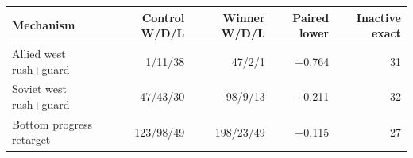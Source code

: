 \begin{tabular}{@{}lrrrr@{}}
\toprule
Mechanism & Control W/D/L & Winner W/D/L & Paired lower & Inactive exact \\
\midrule
Allied west rush+guard & 1/11/38 & 47/2/1 & +0.764 & 31 \\
Soviet west rush+guard & 47/43/30 & 98/9/13 & +0.211 & 32 \\
Bottom progress retarget & 123/98/49 & 198/23/49 & +0.115 & 27 \\
\bottomrule
\end{tabular}
